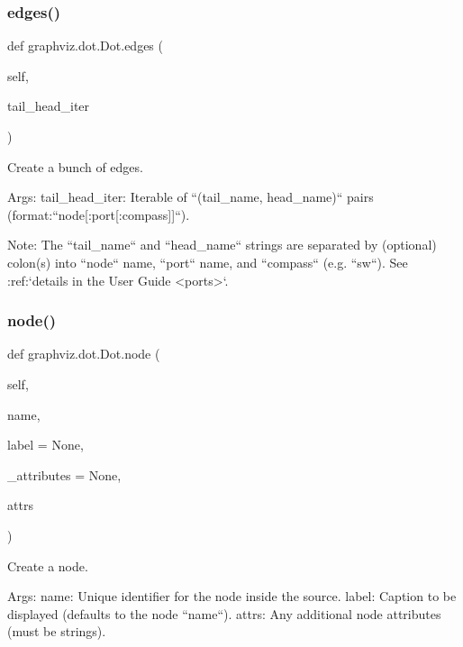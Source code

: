 \subsubsection{\texorpdfstring{edges()}{edges()}}
{\footnotesize\ttfamily def graphviz.\+dot.\+Dot.\+edges (\begin{DoxyParamCaption}\item[{}]{self,  }\item[{}]{tail\+\_\+head\+\_\+iter }\end{DoxyParamCaption})}

\begin{DoxyVerb}Create a bunch of edges.

Args:
    tail_head_iter: Iterable of ``(tail_name, head_name)`` pairs
    (format:``node[:port[:compass]]``).


Note:
    The ``tail_name`` and ``head_name`` strings are separated by
    (optional) colon(s) into ``node`` name, ``port`` name, and
    ``compass`` (e.g. ``sw``).
    See :ref:`details in the User Guide <ports>`.
\end{DoxyVerb}
 \mbox{\label{classgraphviz_1_1dot_1_1Dot_ac60d7ff64538a6cb84516a1d4bcf0200}} 
\subsubsection{\texorpdfstring{node()}{node()}}
{\footnotesize\ttfamily def graphviz.\+dot.\+Dot.\+node (\begin{DoxyParamCaption}\item[{}]{self,  }\item[{}]{name,  }\item[{}]{label = {\ttfamily None},  }\item[{}]{\+\_\+attributes = {\ttfamily None},  }\item[{}]{attrs }\end{DoxyParamCaption})}

\begin{DoxyVerb}Create a node.

Args:
    name: Unique identifier for the node inside the source.
    label: Caption to be displayed (defaults to the node ``name``).
    attrs: Any additional node attributes (must be strings).
\end{DoxyVerb}
 \mbox{\label{classgraphviz_1_1dot_1_1Dot_a3186e73a3478512be5ab6b3106dac162}} 
